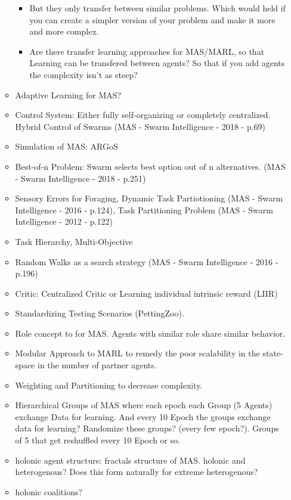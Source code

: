 \begin{itemize}
\begin{itemize}[noitemsep,nolistsep]
\begin{itemize}[noitemsep,nolistsep]
			\item But they only transfer between similar problems. Which would held if you can create a simpler version of your problem and make it more and more complex.
			\item Are there transfer learning approaches for MAS/MARL, so that Learning can be transfered between agents? So that if you add agents the complexity isn't as steep?
		\end{itemize}
		\item Adaptive Learning for MAS?
		\item Control System: Either fully self-organizing or completely centralized. Hybrid Control of Swarms (MAS - Swarm Intelligence - 2018 - p.69)
		\item Simulation of MAS: ARGoS
		\item Best-of-n Problem: Swarm selects best option out of n alternatives. (MAS - Swarm Intelligence - 2018 - p.251)
		\item Sensory Errors for Foraging, Dynamic Task Partiotioning (MAS - Swarm Intelligence - 2016 - p.124), Task Partitioning Problem (MAS - Swarm Intelligence - 2012 - p.122)
		\item Task Hierarchy, Multi-Objective
		\item Random Walks as a search strategy (MAS - Swarm Intelligence - 2016 - p.196)
		\item Critic: Centralized Critic or Learning individual intrinsic reward (LIIR)
		\item Standardizing Testing Scenarios (PettingZoo).
		\item Role concept to for MAS. Agents with similar role share similar behavior.
		\item Modular Approach to MARL to remedy the poor scalability in the state-space in the number of partner agents.
		\item Weighting and Partitioning to decrease complexity.
		\item Hierarchical Groups of MAS where each epoch each Group (5 Agents) exchange Data for learning. And every 10 Epoch the groups exchange data for learning? Randomize these groups? (every few epoch?). Groups of 5 that get reshuffled every 10 Epoch or so.
		\item holonic agent structure: fractals structure of MAS. holonic and heterogenous? Does this form naturally for extreme heterogenous?
		\item holonic coalitions?
	\end{itemize}
\end{itemize}

